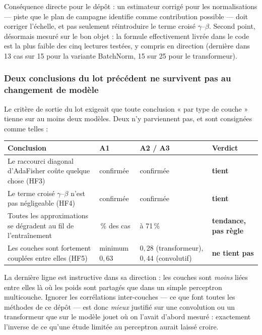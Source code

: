 \documentclass[11pt,a4paper]{article}
\begin{document}
Conséquence directe pour le dépôt : un estimateur corrigé pour les normalisations — piste que le
plan de campagne identifie comme contribution possible — doit corriger l'échelle, et pas seulement
réintroduire le terme croisé $\gamma$--$\beta$. Second point, désormais mesuré sur le bon objet : la
formule effectivement livrée dans le code est la plus faible des cinq lectures testées, y compris en
direction (dernière dans 13 cas sur 15 pour la variante BatchNorm, 15 sur 25 pour le transformeur).

\subsubsection*{Deux conclusions du lot précédent ne survivent pas au changement de modèle}

Le critère de sortie du lot exigeait que toute conclusion « par type de couche » tienne sur au moins
deux modèles. Deux n'y parviennent pas, et sont consignées comme telles :

\begin{center}\small
\begin{tabular}{@{}>{\raggedright\arraybackslash}p{5.4cm}>{\raggedright\arraybackslash}p{2.0cm}>{\raggedright\arraybackslash}p{2.6cm}>{\raggedright\arraybackslash}p{2.6cm}@{}}
\toprule
Conclusion & A1 & A2 / A3 & Verdict \\
\midrule
Le raccourci diagonal d'AdaFisher coûte quelque chose (HF3) & confirmée & confirmée & \textbf{tient} \\
Le terme croisé $\gamma$--$\beta$ n'est pas négligeable (HF4) & confirmée & confirmée & \textbf{tient} \\
Toutes les approximations se dégradent au fil de l'entraînement & 95\,\% des cas & 52 à 71\,\% & \textbf{tendance, pas règle} \\
Les couches sont fortement couplées entre elles (HF5) & minimum $0{,}63$ & $0{,}28$ (transformeur), $0{,}44$ (convolutif) & \textbf{ne tient pas} \\
\bottomrule
\end{tabular}
\end{center}

La dernière ligne est instructive dans sa direction : les couches sont \emph{moins} liées entre
elles là où les poids sont partagés que dans un simple perceptron multicouche. Ignorer les
corrélations inter-couches — ce que font toutes les méthodes de ce dépôt — est donc \emph{mieux}
justifié sur une convolution ou un transformeur que sur le modèle jouet où on l'avait d'abord
mesuré : exactement l'inverse de ce qu'une étude limitée au perceptron aurait laissé croire.
\end{document}
